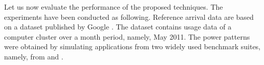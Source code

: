 
Let us now evaluate the performance of the proposed techniques. The experiments
have been conducted as following. Reference arrival data are based on a dataset
published by Google \cite{google}. The dataset contains usage data of a computer
cluster over a month period, namely, May 2011. The power patterns were obtained
by simulating applications from two widely used benchmark suites, namely, from
 \cite{bienia2011} and  \cite{cpu2006}.
